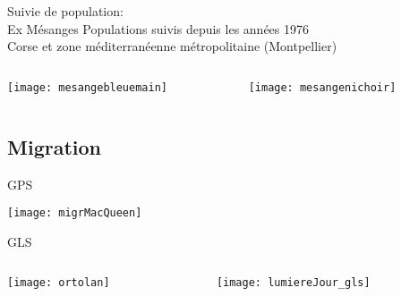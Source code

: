 \documentclass[10pt]{beamer}
\begin{document}
\begin{frame}{Suivie de population:\\ Ex Mésanges}
 Populations suivis depuis les années 1976 \\
       Corse et zone méditerranéenne métropolitaine (Montpellier) 
 \begin{columns}
    \begin{column}[c]{0.5\textwidth}
     \begin{center}
       \texttt{[image: mesangebleuemain]}
  \end{center}
    \end{column}
    \begin{column}[c]{0.5\textwidth}
     \begin{center}
       \texttt{[image: mesangenichoir]}
  \end{center}
    \end{column}
  \end{columns}
\end{frame}

\subsection{Migration} 

\begin{frame}{GPS}
  \begin{center}
    \texttt{[image: migrMacQueen]}   
  \end{center}  
\end{frame}

\begin{frame}{GLS}
  \begin{columns}
    \begin{column}[c]{0.4\textwidth}
     \begin{center}
           \texttt{[image: ortolan]}
  \end{center}
    \end{column}
    \begin{column}[c]{0.6\textwidth}
     \begin{center}
            \texttt{[image: lumiereJour\_gls]}
  \end{center}
    \end{column}
  \end{columns}
\end{frame}
\end{document}
